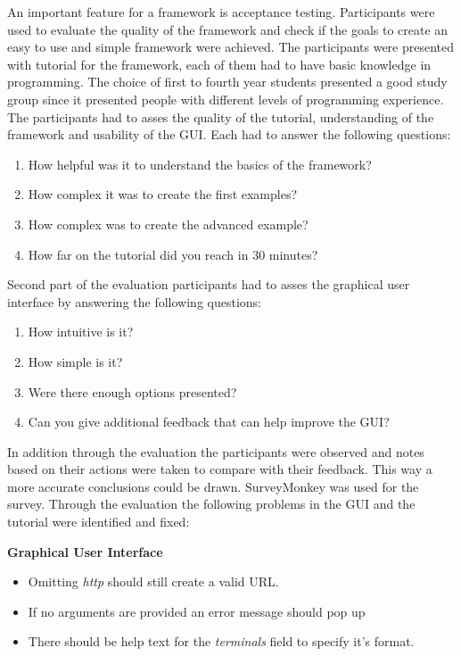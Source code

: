 An important feature for a framework is acceptance testing. Participants were used to evaluate the quality of the framework and check if the goals
to create an easy to use and simple framework were achieved. The participants were presented with tutorial for the framework, 
each of them had to have basic knowledge in programming. The choice of first to fourth year students presented a good study group since it presented people
with different levels of programming experience. The participants had to asses the quality of the 
tutorial, understanding of the framework and usability of the GUI. Each had to answer the following questions\cite{monkey}:

\begin{enumerate}
\item How helpful was it to understand the basics of the framework?
\item How complex it was to create the first examples?
\item How complex was to create the advanced example?
\item How far on the tutorial did you reach in 30 minutes?
\end{enumerate}
 
Second part of the evaluation participants had to asses the graphical user interface by answering the following questions: 

\begin{enumerate}
\item How intuitive is it?
\item How simple is it?
\item Were there enough options presented?
\item Can you give additional feedback that can help improve the GUI?
\end{enumerate}

In addition through the evaluation the participants were observed and notes based on their actions were taken to compare with their feedback. This way a more
accurate conclusions could be drawn. SurveyMonkey was used for the survey. Through the evaluation the following problems in the GUI and the tutorial were identified and fixed:

\textbf{Graphical User Interface}
\begin{itemize}
\item Omitting \textit{http} should still create a valid URL.
\item If no arguments are provided an error message should pop up
\item There should be help text for the \textit{terminals} field to specify it's format.
\end{itemize}

